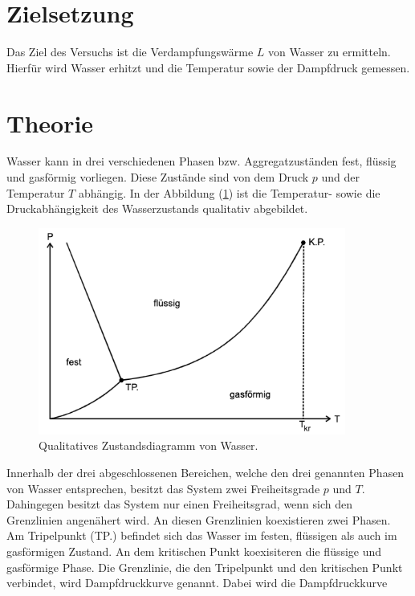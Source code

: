 \section{Zielsetzung}
\label{sec:Zielsetzung}
\nocite{anleitungV203}
Das Ziel des Versuchs ist die Verdampfungswärme $L$ von Wasser zu ermitteln. Hierfür wird Wasser erhitzt und
die Temperatur sowie der Dampfdruck gemessen.

\section{Theorie}
\label{sec:Theorie}
Wasser kann in drei verschiedenen Phasen bzw. Aggregatzuständen fest, flüssig und gasförmig vorliegen.
Diese Zustände sind von dem Druck $p$ und der Temperatur $T$ abhängig. In der Abbildung (\ref{fig:ZustandsdiagrammWasser})
ist die Temperatur- sowie die Druckabhängigkeit des Wasserzustands qualitativ abgebildet.
\begin{figure}[H]
    \centering
    \includegraphics[width=0.90\textwidth]{ZustandsdiagrammWasser.png}
    \caption{Qualitatives Zustandsdiagramm von Wasser. \cite{anleitungV203}}
    \label{fig:ZustandsdiagrammWasser}
\end{figure}
Innerhalb der drei abgeschlossenen Bereichen, welche den drei genannten Phasen von Wasser entsprechen, besitzt das System 
zwei Freiheitsgrade $p$ und $T$. Dahingegen besitzt das System nur einen Freiheitsgrad, wenn sich den Grenzlinien angenähert wird. An diesen
Grenzlinien koexistieren zwei Phasen. Am Tripelpunkt (TP.) befindet sich das Wasser im festen, flüssigen als auch im gasförmigen Zustand.
An dem kritischen Punkt koexisiteren die flüssige und gasförmige Phase. 
Die Grenzlinie, die den Tripelpunkt und den kritischen Punkt verbindet, wird Dampfdruckkurve genannt. Dabei wird die Dampfdruckkurve
